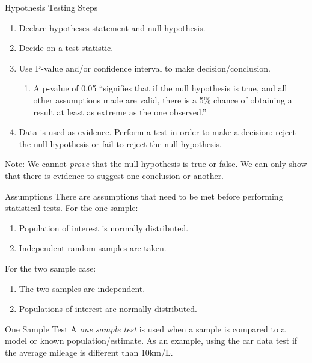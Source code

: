 \documentclass[xcolor=svgnames, 10pt, handout]{beamer}
\begin{document}
\begin{frame}[fragile]{Hypothesis Testing Steps}
\begin{enumerate}
\item Declare hypotheses statement and null hypothesis.
\item Decide on a test statistic.
\item Use P-value and/or confidence interval to make decision/conclusion.
\begin{enumerate}
\item A p-value of 0.05 ``signifies that if the null hypothesis is true, and all other assumptions made are valid, there is a 5\% chance of obtaining a result at least as extreme as the one observed.''
\end{enumerate}
\item Data is used as evidence.  Perform a test in order to make a decision:  reject the null hypothesis or fail to reject the null hypothesis.
\end{enumerate}
\vfill
Note: We cannot \emph{prove} that the null hypothesis is true or false. We can only show that there is evidence to suggest one conclusion or another. 
\end{frame}

\begin{frame}[fragile]{Assumptions}
\vfill
There are assumptions that need to be met before performing statistical tests.
\vfill
For the one sample:
\begin{enumerate}
\item Population of interest is normally distributed.
\item Independent random samples are taken.
\end{enumerate}
\vfill
For the two sample case:
\begin{enumerate}
\item The two samples are independent.
\item Populations of interest are normally distributed.
\end{enumerate}
\vfill
\end{frame}


\begin{frame}[fragile]{One Sample Test}
\vfill
A \emph{one sample test} is used when a sample is compared to a model or known population/estimate.
\vfill
As an example, using the car data test if the average mileage is different than 10km/L.
\vfill
\end{frame}
\end{document}
